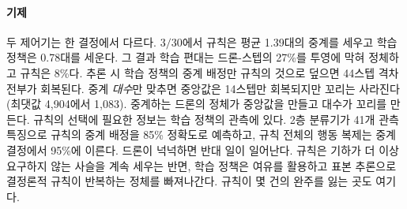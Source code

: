 \documentclass[final,5p,times,twocolumn]{elsarticle}
\begin{document}
\paragraph{기제}
두 제어기는 한 결정에서 다르다. $3/30$에서 규칙은 평균 1.39대의 중계를 세우고 학습 정책은
0.78대를 세운다. 그 결과 학습 편대는 드론-스텝의 27\%를 투영에 막혀 정체하고 규칙은 8\%다.
추론 시 학습 정책의 중계 배정만 규칙의 것으로 덮으면 44스텝 격차 전부가 회복된다. 중계
\emph{대수}만 맞추면 중앙값은 14스텝만 회복되지만 꼬리는 사라진다(최댓값 4{,}904에서 1{,}083).
중계하는 드론의 정체가 중앙값을 만들고 대수가 꼬리를 만든다. 규칙의 선택에 필요한 정보는
학습 정책의 관측에 있다. 2층 분류기가 41개 관측 특징으로 규칙의 중계 배정을 85\% 정확도로
예측하고, 규칙 전체의 행동 복제는 중계 결정에서 95\%에 이른다. 드론이 넉넉하면 반대 일이
일어난다. 규칙은 기하가 더 이상 요구하지 않는 사슬을 계속 세우는 반면, 학습 정책은 여유를
활용하고 표본 추론으로 결정론적 규칙이 반복하는 정체를 빠져나간다. 규칙이 몇 건의 완주를 잃는
곳도 여기다.
\end{document}
